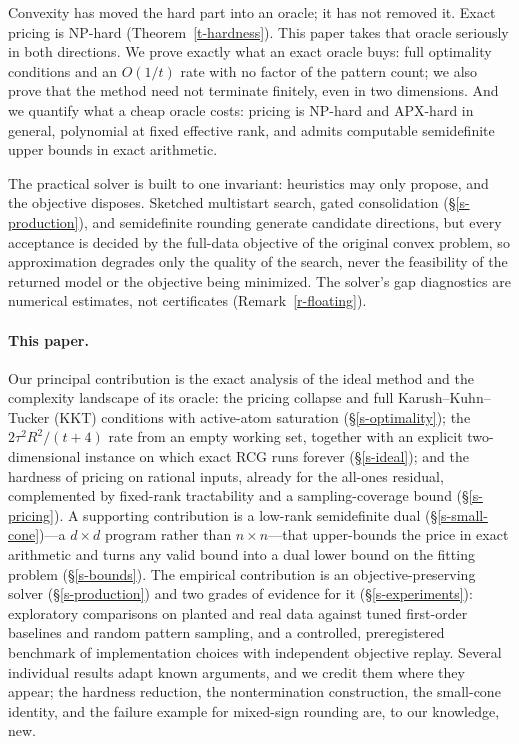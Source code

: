 \documentclass[12pt]{article}
\theoremstyle{plain}
\theoremstyle{definition}
\begin{document}
Convexity has moved the hard part into an oracle; it has not removed it.
Exact pricing is NP-hard (Theorem~\ref{t-hardness}). This paper takes that
oracle seriously in both directions. We prove exactly what an exact oracle
buys: full optimality conditions and an $O(1/t)$ rate with no factor of the
pattern count; we also prove that the method need not terminate finitely, even
in two dimensions. And we quantify what a cheap oracle costs: pricing is NP-hard and
APX-hard in general, polynomial at fixed effective rank, and admits computable
semidefinite upper bounds in exact arithmetic.

The practical solver is built to one invariant: heuristics may only propose,
and the objective disposes. Sketched multistart search, gated consolidation
(\S\ref{s-production}), and semidefinite rounding generate candidate directions, but
every acceptance is decided by the full-data objective of the original convex
problem, so approximation degrades only the quality of the search, never the
feasibility of the returned model or the objective being minimized. The
solver's gap diagnostics are numerical estimates, not certificates
(Remark~\ref{r-floating}).

\paragraph{This paper.}
Our principal contribution is the exact analysis of the ideal method and the
complexity landscape of its oracle: the pricing collapse and full
Karush--Kuhn--Tucker (KKT) conditions with active-atom saturation
(\S\ref{s-optimality}); the $2\tau^2R^2/(t+4)$ rate from an empty working set,
together with an explicit two-dimensional instance on which exact RCG runs
forever (\S\ref{s-ideal}); and the hardness of pricing on rational inputs,
already for the all-ones residual, complemented by fixed-rank tractability and
a sampling-coverage bound (\S\ref{s-pricing}). A supporting contribution is a
low-rank semidefinite dual (\S\ref{s-small-cone})---a $d\times d$ program
rather than $n\times n$---that upper-bounds the price in exact arithmetic and turns any valid bound
into a dual lower bound on the fitting problem (\S\ref{s-bounds}). The
empirical contribution is an objective-preserving solver
(\S\ref{s-production}) and two grades of evidence for it
(\S\ref{s-experiments}): exploratory comparisons on planted and real data
against tuned first-order baselines and random pattern sampling, and a
controlled, preregistered benchmark of implementation choices with independent
objective replay. Several individual results adapt known arguments, and we
credit them where they appear; the hardness reduction, the nontermination
construction, the small-cone identity, and the failure example for mixed-sign
rounding are, to our knowledge, new.
\end{document}
